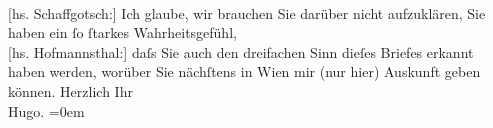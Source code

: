 \begin{ledgroupsized}[t]{13cm}
                        {\\}{[}hs. Schaffgotsch:{]} Ich glaube, wir brauchen Sie darüber nicht
                    aufzuklären, Sie haben ein ſo ſtarkes Wahrheitsgefühl, {\\}{[}hs. Hofmannsthal:{]} daſs Sie auch den dreifachen Sinn dieſes Briefes erkannt
                    haben werden, worüber Sie nächſtens in Wien mir
                    (nur hier) Auskunft geben können.\pend
           \pstart
           Herzlich Ihr{\\[\baselineskip]}\spacefill\mbox{Hugo.}\pend
           \leftskip=0em{}\endnumbering{}\end{ledgroupsized}  \newcommand{\dateiname}{L00580}\newcommand{\titel}{Hugo von Hofmannsthal und Hermine Benedict an Arthur Schnitzler, 21. [8. 1896]}\newcommand{\editorInnen}{Martin Anton Müller und Gerd-Hermann Susen}
      
